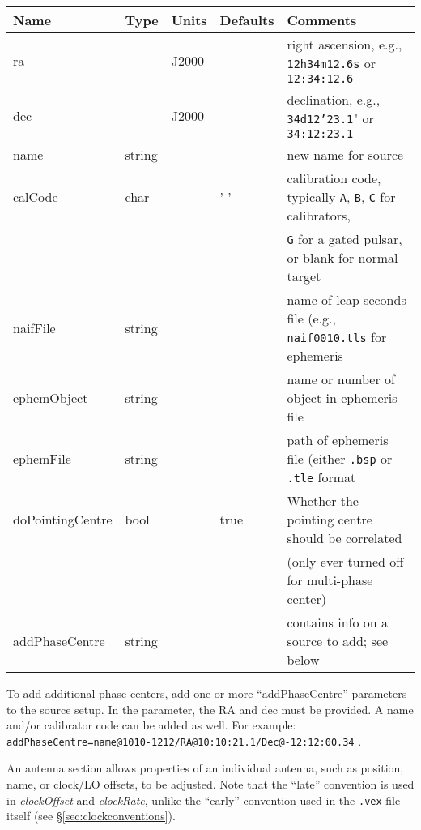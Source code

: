 \begin{center}
\begin{tabular}{l l l l l}
\hline
Name			& Type		& Units & Defaults	& Comments \\
\hline
ra			&		& J2000 &		& right ascension, e.g., {\tt 12h34m12.6s} or {\tt 12:34:12.6} \\
dec			&		& J2000 &		& declination, e.g., {\tt 34d12'23.1}" or {\tt 34:12:23.1} \\
name			& string	&       &		& new name for source \\
calCode			& char		&       & ' '		& calibration code, typically {\tt A}, {\tt B}, {\tt C} for calibrators, \\
			&		&	&		& {\tt G} for a gated pulsar, or blank for normal target \\
naifFile		& string	&       &		& name of leap seconds file (e.g., {\tt naif0010.tls} for ephemeris \\
ephemObject		& string	&       &		& name or number of object in ephemeris file \\
ephemFile		& string	&       &		& path of ephemeris file (either {\tt .bsp} or {\tt .tle} format \\
doPointingCentre	& bool		&	& true		& Whether the pointing centre should be correlated \\
			&		&	&		& (only ever turned off for multi-phase center) \\
addPhaseCentre		& string	&       &		& contains info on a source to add; see below \\
\hline
\hline
\end{tabular}
\end{center}

To add additional phase centers, add one or more ``addPhaseCentre'' parameters to the source setup.
In the parameter, the RA and dec must be provided.
A name and/or calibrator code can be added as well.
For example: {\tt addPhaseCentre=name@1010-1212/RA@10:10:21.1/Dec@-12:12:00.34} .


An antenna section allows properties of an individual antenna, such as position, name, or clock/LO offsets, to be adjusted. 
Note that the ``late'' convention is used in {\em clockOffset} and {\em clockRate}, unlike the ``early'' convention used in the {\tt .vex} file itself (see \S\ref{sec:clockconventions}).

